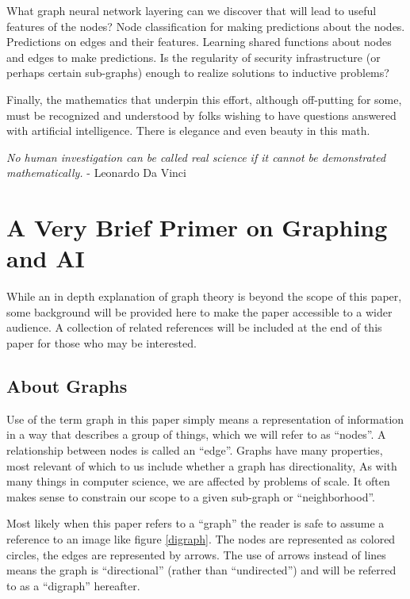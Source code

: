What graph neural network layering can we discover that will lead to useful features of the nodes?
  Node classification for making predictions about the nodes.
  Predictions on edges and their features.
  Learning shared functions about nodes and edges to make predictions. 
Is the regularity of security infrastructure (or perhaps certain sub-graphs) enough to realize solutions to inductive problems?

\justifying
Finally, the mathematics that underpin this effort, although off-putting for some, must be recognized and understood by
folks wishing to have questions answered with artificial intelligence. There is elegance and even beauty in this math.
\vspace{2mm}

\begin{displayquote}
	\emph{No human investigation can be called real science if it cannot be demonstrated mathematically.}
	- Leonardo Da Vinci
\end{displayquote}

\clearpage
\section{\label{sec:primer}A Very Brief Primer on Graphing and AI}

\justifying
While an in depth explanation of graph theory is beyond the scope of this paper, some background
will be provided here to make the paper accessible to a wider audience. A collection of related references
will be included at the end of this paper for those who may be interested.

\subsection{\label{sec:Graph}About Graphs}

\justifying
Use of the term graph in this paper simply means a representation of information in a way that describes a group of 
things, which we will refer to as ``nodes''. A relationship between nodes is called an ``edge''. Graphs have many 
properties, most relevant of which to us include whether a graph has directionality, As with many things in computer
science, we are affected by problems of scale. It often makes sense to constrain our scope to a given sub-graph or ``neighborhood''.
\vspace{2mm}

\justifying
Most likely when this paper refers to a ``graph'' the reader is safe to assume a reference to an image like figure \ref{digraph}. The nodes are represented as colored circles, the edges are represented by arrows. The use of arrows
instead of lines means the graph is ``directional'' (rather than ``undirected'') and will be referred to as a ``digraph''
hereafter.
\vspace{2mm}

